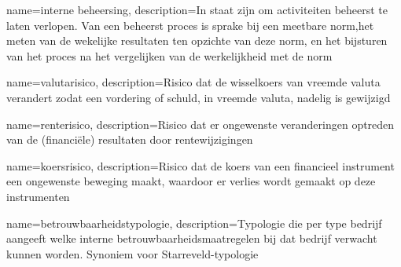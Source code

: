 {
    name=interne beheersing,
    description={In staat zijn om activiteiten beheerst te laten verlopen. Van een beheerst proces is sprake bij een meetbare norm,het meten van de wekelijke resultaten ten opzichte van deze norm, en het bijsturen van het proces na het vergelijken van de werkelijkheid met de norm}
}

{
    name=valutarisico,
    description={Risico dat de wisselkoers van vreemde valuta verandert zodat een vordering of schuld, in vreemde valuta, nadelig is gewijzigd}
}

{
    name=renterisico,
    description={Risico dat er ongewenste veranderingen optreden van de (financiële) resultaten door rentewijzigingen}
}

{
    name=koersrisico,
    description={Risico dat de koers van een financieel instrument een ongewenste beweging maakt, waardoor er verlies wordt gemaakt op deze instrumenten}
}

{
    name=betrouwbaarheidstypologie,
    description={Typologie die per type bedrijf aangeeft welke interne betrouwbaarheidsmaatregelen bij dat bedrijf verwacht kunnen worden. Synoniem voor Starreveld-typologie}
}

%